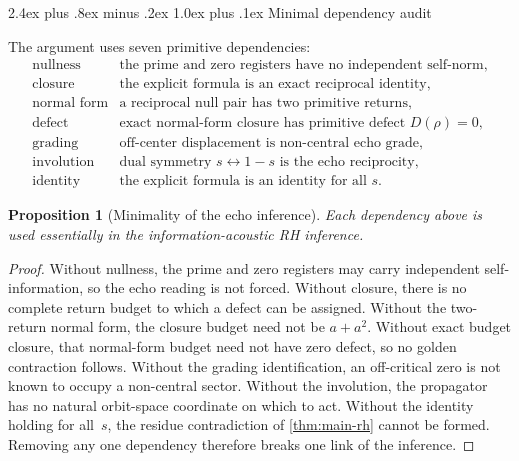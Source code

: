 \documentclass[11pt,a4paper]{article}
\makeatletter
\theoremstyle{plain}
\newtheorem{proposition}[theorem]{Proposition}
\theoremstyle{definition}
\theoremstyle{remark}
\numberwithin{equation}{section}
\renewcommand{\subsection}{%
  \@startsection{subsection}{2}{0pt}%
    {2.4ex plus .8ex minus .2ex}%
    {1.0ex plus .1ex}%
    {\normalfont\Large\bfseries\color{headingAccent}}%
}
\makeatother
\begin{document}
\subsection{Minimal dependency audit}
\label{subsec:minimal-dependency}

The argument uses seven primitive dependencies:
\[
\begin{array}{ll}
\text{nullness} & \text{the prime and zero registers have no independent self-norm},\\
\text{closure} & \text{the explicit formula is an exact reciprocal identity},\\
\text{normal form} & \text{a reciprocal null pair has two primitive returns},\\
\text{defect} & \text{exact normal-form closure has primitive defect }D(\rho)=0,\\
\text{grading} & \text{off-center displacement is non-central echo grade},\\
\text{involution} & \text{dual symmetry }s\leftrightarrow1{-}s\text{ is the echo reciprocity},\\
\text{identity} & \text{the explicit formula is an identity for all }s.
\end{array}
\]

\begin{proposition}[Minimality of the echo inference]
\label{prop:minimality}
Each dependency above is used essentially in the information-acoustic RH
inference.
\end{proposition}

\begin{proof}
Without nullness, the prime and zero registers may carry independent
self-information, so the echo reading is not forced.  Without closure,
there is no complete return budget to which a defect can be assigned.
Without the two-return normal form, the closure budget need not be
\(a+a^2\).  Without exact budget closure, that normal-form budget need
not have zero defect, so no golden contraction follows.  Without the
grading identification, an off-critical zero is not known to occupy a
non-central sector.  Without the involution, the propagator has no
natural orbit-space coordinate on which to act.  Without the identity
holding for all~\(s\), the residue contradiction of
\cref{thm:main-rh} cannot be formed.  Removing any one dependency
therefore breaks one link of the inference.
\end{proof}
\end{document}
